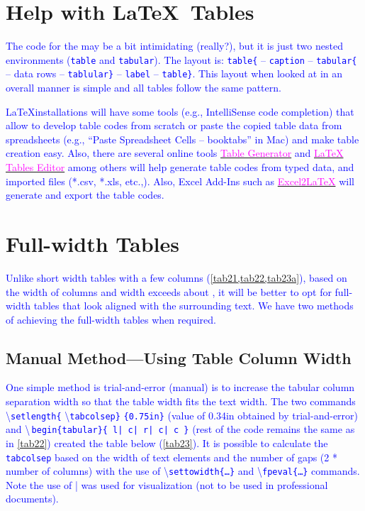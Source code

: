 \documentclass[phd]{ndsu-thesis-2022}
\newcommand\italk[1]{\textcolor{blue}{#1}}  %
\newcommand\cmd[1]{\textbackslash\texttt{#1}}  %
\newcommand\vb[1]{\textcolor{blue}{\texttt{#1}}}%
\newcommand\vbc[1]{\textcolor{blue}{\textbackslash\,\texttt{#1}}}%
\begin{document}
\section{Help with \LaTeX\ Tables}
\italk{The code for the  may be a bit intimidating (really?), but it is just two nested environments (\vb{table} and \vb{tabular}). The layout is: \vb{table\{} -- \vb{caption} -- \vb{tabular\{} -- data rows -- \vb{tablular\}} -- \vb{label} -- \vb{table\}}. This layout when looked at in an overall manner is simple and all tables follow the same pattern.}  

\italk{\LaTeX installations will have some tools (e.g., IntelliSense code completion) that allow to develop table codes from scratch or paste the copied table data from spreadsheets (e.g., ``Paste Spreadsheet Cells -- booktabs'' in Mac) and make table creation easy. Also, there are several online tools \href{https://www.tablesgenerator.com}{\textcolor{magenta}{Table Generator}} and \href{https://www.latex-tables.com}{\textcolor{magenta}{LaTeX Tables Editor}} among others will help generate table codes from typed data, and imported files (*.csv, *.xls, etc.,). Also, Excel Add-Ins such as \href{https://ctan.org/tex-archive/support/excel2latex?lang=en}{\textcolor{magenta}{Excel2\LaTeX}} will generate and export the table codes. 
}

\section{Full-width Tables}
\italk{Unlike short width tables with a few columns (\cref{tab21,tab22,tab23a}), based on the width of columns and width exceeds about \pr{60}, it will be better to opt for full-width tables that look aligned with the surrounding text. We have two methods of achieving the full-width tables when required.}

\subsection{Manual Method---Using Table Column Width}
\italk{One simple method is trial-and-error (manual) is to increase the tabular column separation width so that the table width fits the text width. The two commands \cmd{setlength\{} \cmd{tabcolsep\}} \vb{\{0.75in\}} (value of 0.34in obtained by trial-and-error) and \vbc{begin\{tabular\}\{ l|   c|   r|   c|   c \}} (rest of the code remains the same as in \cref{tab22}) created the table below (\cref{tab23}). It is possible to calculate the \vb{tabcolsep} based on the width of text elements and the number of gaps (2 * number of columns) with the use of \cmd{settowidth\{\ldots\}} and \cmd{fpeval\{\ldots\}} commands. Note the use of | was used for visualization (not to be used in professional documents).} 
\end{document}
